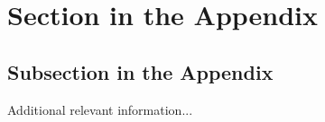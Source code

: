 \documentclass[english]{article}
\begin{document}
\clearpage
\appendix

\section{Section in the Appendix}
\label{sec:app1}

\subsection{Subsection in the Appendix}
\label{subsec:app2}

Additional relevant information...
\end{document}
